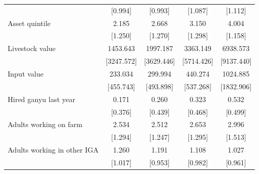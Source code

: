\begin{tabular}{l cc cc}
 & [0.994] & [0.993] & [1.087] & [1.112] \\ 
Asset quintile & 2.185    & 2.668    & 3.150    & 4.004    \\ 
 & [1.250] & [1.270] & [1.298] & [1.158] \\ 
Livestock value & 1453.643 & 1997.187 & 3363.149 & 6938.573 \\ 
 & [3247.572] & [3629.446] & [5714.426] & [9137.440] \\ 
Input value & 233.034  & 299.994  & 440.274  & 1024.885 \\ 
 & [455.743] & [493.898] & [537.268] & [1832.906] \\ 
Hired ganyu last year & 0.171    & 0.260    & 0.323    & 0.532    \\ 
 & [0.376] & [0.439] & [0.468] & [0.499] \\ 
Adults working on farm & 2.534    & 2.512    & 2.653    & 2.996    \\ 
 & [1.294] & [1.247] & [1.295] & [1.513] \\ 
Adults working in other IGA & 1.260    & 1.191    & 1.108    & 1.027    \\ 
 & [1.017] & [0.953] & [0.982] & [0.961] \\ 
\hline
\end{tabular}
